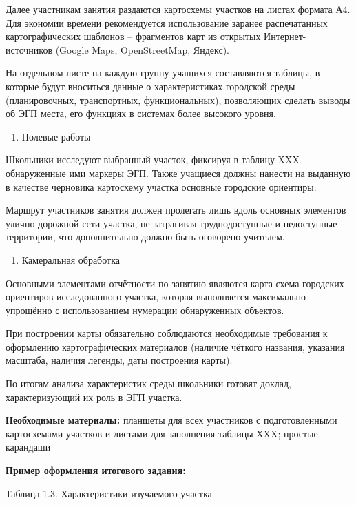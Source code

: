 \documentclass[
  11pt,
]{book}
\providecommand{\tightlist}{%
  \setlength{\itemsep}{0pt}\setlength{\parskip}{0pt}}
\begin{document}
Далее участникам занятия раздаются картосхемы участков на листах формата А4. Для экономии времени рекомендуется использование заранее распечатанных картографических шаблонов -- фрагментов карт из открытых Интернет-источников (Google Maps, OpenStreetMap, Яндекс).

На отдельном листе на каждую группу учащихся составляются таблицы, в которые будут вноситься данные о характеристиках городской среды (планировочных, транспортных, функциональных), позволяющих сделать выводы об ЭГП места, его функциях в системах более высокого уровня.

\begin{enumerate}
\def\labelenumi{\arabic{enumi}.}
\setcounter{enumi}{1}
\tightlist
\item
  Полевые работы
\end{enumerate}

Школьники исследуют выбранный участок, фиксируя в таблицу XXX обнаруженные ими маркеры ЭГП. Также учащиеся должны нанести на выданную в качестве черновика картосхему участка основные городские ориентиры.

Маршрут участников занятия должен пролегать лишь вдоль основных элементов улично-дорожной сети участка, не затрагивая труднодоступные и недоступные территории, что дополнительно должно быть оговорено учителем.

\begin{enumerate}
\def\labelenumi{\arabic{enumi}.}
\setcounter{enumi}{2}
\tightlist
\item
  Камеральная обработка
\end{enumerate}

Основными элементами отчётности по занятию являются карта-схема городских ориентиров исследованного участка, которая выполняется максимально упрощённо с использованием нумерации обнаруженных объектов.

При построении карты обязательно соблюдаются необходимые требования к оформлению картографических материалов (наличие чёткого названия, указания масштаба, наличия легенды, даты построения карты).

По итогам анализа характеристик среды школьники готовят доклад, характеризующий их роль в ЭГП участка.

\textbf{Необходимые материалы:} планшеты для всех участников с подготовленными картосхемами участков и листами для заполнения таблицы ХXX; простые карандаши

\textbf{Пример оформления итогового задания:}

Таблица 1.3. Характеристики изучаемого участка
\end{document}
